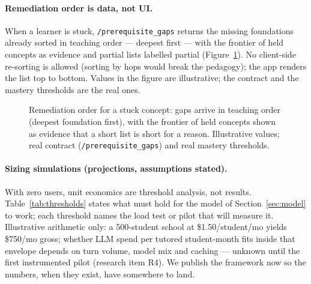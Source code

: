\documentclass[11pt,a4paper]{article}
\begin{document}
\paragraph{Remediation order is data, not UI.} When a learner is stuck,
\texttt{/prerequisite\_gaps} returns the missing foundations already sorted in
teaching order --- deepest first --- with the frontier of held concepts as
evidence and partial lists labelled partial (Figure~\ref{fig:prereq}). No
client-side re-sorting is allowed (sorting by hops would break the pedagogy);
the app renders the list top to bottom. Values in the figure are illustrative;
the contract and the mastery thresholds are the real ones.

\begin{figure}[h]
\centering
{}
\caption{Remediation order for a stuck concept: gaps arrive in teaching order
(deepest foundation first), with the frontier of held concepts shown as
evidence that a short list is short for a reason. Illustrative values; real
contract (\texttt{/prerequisite\_gaps}) and real mastery thresholds.}
\label{fig:prereq}
\end{figure}

\paragraph{Sizing simulations (projections, assumptions stated).} With zero
users, unit economics are threshold analysis, not results. Table~\ref{tab:thresholds}
states what must hold for the model of Section~\ref{sec:model} to work; each
threshold names the load test or pilot that will measure it. Illustrative
arithmetic only: a 500-student school at \$1.50/student/mo yields \$750/mo
gross; whether LLM spend per tutored student-month fits inside that envelope
depends on turn volume, model mix and caching --- unknown until the first
instrumented pilot (research item R4). We publish the framework now so the
numbers, when they exist, have somewhere to land.
\end{document}
